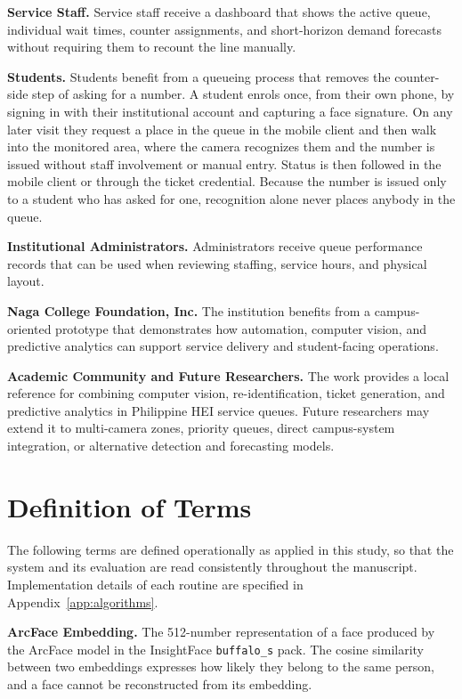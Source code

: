 \documentclass{research}
\begin{document}
\textbf{Service Staff.} Service staff receive a dashboard that shows
the active queue, individual wait times, counter assignments, and
short-horizon demand forecasts without requiring them to recount the
line manually.

\textbf{Students.} Students benefit from a queueing process that removes
the counter-side step of asking for a number. A student enrols once, from
their own phone, by signing in with their institutional account and
capturing a face signature. On any later visit they request a place in
the queue in the mobile client and then walk into the monitored area,
where the camera recognizes them and the number is issued without staff
involvement or manual entry. Status is then followed in the mobile client
or through the ticket credential. Because the number is issued only to a
student who has asked for one, recognition alone never places anybody in
the queue.

\textbf{Institutional Administrators.} Administrators receive queue
performance records that can be used when reviewing staffing, service
hours, and physical layout.

\textbf{Naga College Foundation, Inc.} The institution benefits from a
campus-oriented prototype that demonstrates how automation, computer
vision, and predictive analytics can support service delivery and
student-facing operations.

\textbf{Academic Community and Future Researchers.} The work provides a
local reference for combining computer vision, re-identification,
ticket generation, and predictive analytics in Philippine HEI service
queues. Future researchers may extend it to multi-camera zones,
priority queues, direct campus-system integration, or alternative
detection and forecasting models.

\section{Definition of Terms}
\label{cr:definitions}

The following terms are defined operationally as applied in this study,
so that the system and its evaluation are read consistently throughout
the manuscript. Implementation details of each routine are specified in
Appendix~\ref{app:algorithms}.

\textbf{ArcFace Embedding.} The 512-number representation of a face
produced by the ArcFace model in the InsightFace \texttt{buffalo\_s}
pack. The cosine similarity between two embeddings expresses how likely
they belong to the same person, and a face cannot be reconstructed from
its embedding.
\end{document}
